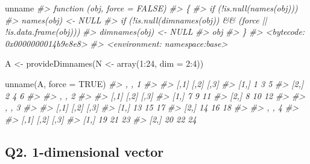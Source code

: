 \documentclass[
]{book}
\newenvironment{Shaded}{\begin{snugshade}}{\end{snugshade}}
\newcommand{\AttributeTok}[1]{\textcolor[rgb]{0.77,0.63,0.00}{#1}}
\newcommand{\CommentTok}[1]{\textcolor[rgb]{0.56,0.35,0.01}{\textit{#1}}}
\newcommand{\ConstantTok}[1]{\textcolor[rgb]{0.00,0.00,0.00}{#1}}
\newcommand{\DecValTok}[1]{\textcolor[rgb]{0.00,0.00,0.81}{#1}}
\newcommand{\FunctionTok}[1]{\textcolor[rgb]{0.00,0.00,0.00}{#1}}
\newcommand{\NormalTok}[1]{#1}
\newcommand{\OtherTok}[1]{\textcolor[rgb]{0.56,0.35,0.01}{#1}}
\newcommand{\SpecialCharTok}[1]{\textcolor[rgb]{0.00,0.00,0.00}{#1}}
\begin{document}
\begin{Shaded}
\begin{Highlighting}[]
\NormalTok{unname}
\CommentTok{\#\textgreater{} function (obj, force = FALSE) }
\CommentTok{\#\textgreater{} \{}
\CommentTok{\#\textgreater{}     if (!is.null(names(obj))) }
\CommentTok{\#\textgreater{}         names(obj) \textless{}{-} NULL}
\CommentTok{\#\textgreater{}     if (!is.null(dimnames(obj)) \&\& (force || !is.data.frame(obj))) }
\CommentTok{\#\textgreater{}         dimnames(obj) \textless{}{-} NULL}
\CommentTok{\#\textgreater{}     obj}
\CommentTok{\#\textgreater{} \}}
\CommentTok{\#\textgreater{} \textless{}bytecode: 0x0000000014b9e8e8\textgreater{}}
\CommentTok{\#\textgreater{} \textless{}environment: namespace:base\textgreater{}}

\NormalTok{A }\OtherTok{\textless{}{-}} \FunctionTok{provideDimnames}\NormalTok{(N }\OtherTok{\textless{}{-}} \FunctionTok{array}\NormalTok{(}\DecValTok{1}\SpecialCharTok{:}\DecValTok{24}\NormalTok{, }\AttributeTok{dim =} \DecValTok{2}\SpecialCharTok{:}\DecValTok{4}\NormalTok{))}

\FunctionTok{unname}\NormalTok{(A, }\AttributeTok{force =} \ConstantTok{TRUE}\NormalTok{)}
\CommentTok{\#\textgreater{} , , 1}
\CommentTok{\#\textgreater{} }
\CommentTok{\#\textgreater{}      [,1] [,2] [,3]}
\CommentTok{\#\textgreater{} [1,]    1    3    5}
\CommentTok{\#\textgreater{} [2,]    2    4    6}
\CommentTok{\#\textgreater{} }
\CommentTok{\#\textgreater{} , , 2}
\CommentTok{\#\textgreater{} }
\CommentTok{\#\textgreater{}      [,1] [,2] [,3]}
\CommentTok{\#\textgreater{} [1,]    7    9   11}
\CommentTok{\#\textgreater{} [2,]    8   10   12}
\CommentTok{\#\textgreater{} }
\CommentTok{\#\textgreater{} , , 3}
\CommentTok{\#\textgreater{} }
\CommentTok{\#\textgreater{}      [,1] [,2] [,3]}
\CommentTok{\#\textgreater{} [1,]   13   15   17}
\CommentTok{\#\textgreater{} [2,]   14   16   18}
\CommentTok{\#\textgreater{} }
\CommentTok{\#\textgreater{} , , 4}
\CommentTok{\#\textgreater{} }
\CommentTok{\#\textgreater{}      [,1] [,2] [,3]}
\CommentTok{\#\textgreater{} [1,]   19   21   23}
\CommentTok{\#\textgreater{} [2,]   20   22   24}
\end{Highlighting}
\end{Shaded}

\hypertarget{q2.-1-dimensional-vector}{%
\subsection*{Q2. 1-dimensional vector}\label{q2.-1-dimensional-vector}}
\end{document}
